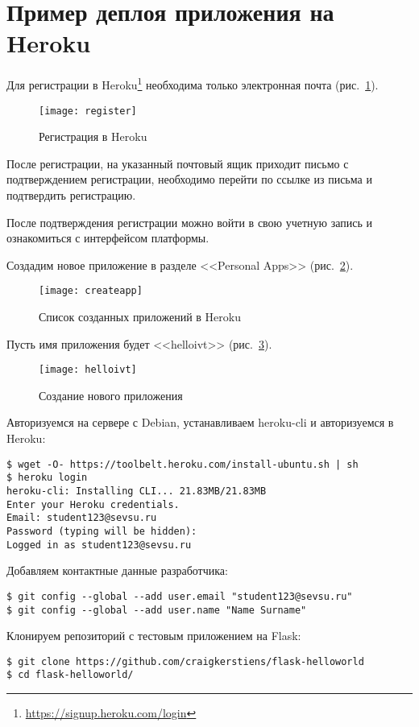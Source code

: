 \section{Пример деплоя приложения на Heroku} \label{pril:e}

Для регистрации в Heroku\footnote{\url{https://signup.heroku.com/login}} необходима только электронная почта (рис.~\ref{pic:heroku_reg}).
\begin{figure}[ht]
    \centering
	\texttt{[image: register]}
    \caption{Регистрация в Heroku}\label{pic:heroku_reg}
\end{figure}

После регистрации, на указанный почтовый ящик приходит письмо с подтверждением регистрации, необходимо перейти по ссылке из письма и подтвердить регистрацию.

После подтверждения регистрации можно войти в свою учетную запись и ознакомиться с интерфейсом платформы.

Создадим новое приложение в разделе <<Personal Apps>> (рис.~\ref{pic:add_app}).
\begin{figure}[ht]
    \centering
	\texttt{[image: createapp]}
    \caption{Список созданных приложений в Heroku}\label{pic:add_app}
\end{figure}

Пусть имя приложения будет <<helloivt>> (рис.~\ref{pic:helloivt}).
\begin{figure}[ht]
    \centering
	\texttt{[image: helloivt]}
    \caption{Создание нового приложения}\label{pic:helloivt}
\end{figure}

Авторизуемся на сервере с Debian, устанавливаем heroku-cli и авторизуемся в Heroku:
\begin{lstlisting}
$ wget -O- https://toolbelt.heroku.com/install-ubuntu.sh | sh
$ heroku login
heroku-cli: Installing CLI... 21.83MB/21.83MB
Enter your Heroku credentials.
Email: student123@sevsu.ru
Password (typing will be hidden):
Logged in as student123@sevsu.ru
\end{lstlisting}

Добавляем контактные данные разработчика:
\begin{lstlisting}
$ git config --global --add user.email "student123@sevsu.ru"
$ git config --global --add user.name "Name Surname"
\end{lstlisting}

Клонируем репозиторий с тестовым приложением на Flask:
\begin{lstlisting}
$ git clone https://github.com/craigkerstiens/flask-helloworld
$ cd flask-helloworld/
\end{lstlisting}

